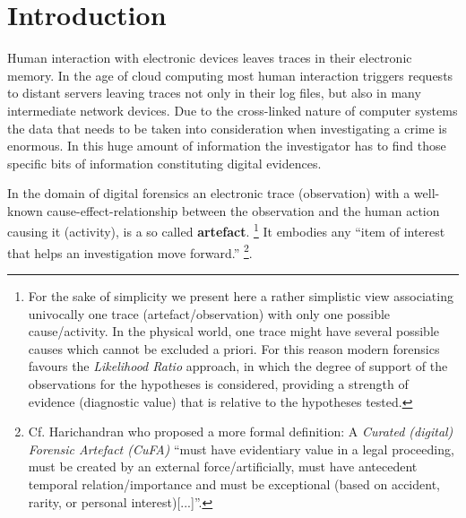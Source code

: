 \documentclass[final,5p,times,twocolumn]{elsarticle}
\begin{document}








\section{Introduction}

Human interaction with electronic devices leaves traces in their electronic
memory. In the age of cloud computing most human interaction triggers requests
to distant servers leaving traces not only in their log files, but also in many
intermediate network devices. Due to the cross-linked nature of computer systems
the data that needs to be taken into consideration when investigating a crime is
enormous. In this huge amount of information the investigator has to find those
specific bits of information constituting digital evidences. 

In the domain of digital forensics an electronic trace (observation) with a
well-known cause-effect-relationship between the observation and the human
action causing it (activity), is a so called \textbf{artefact}.  \footnote{For
the sake of simplicity we present here a rather simplistic view associating
univocally one trace (artefact/observation) with only one possible
cause/activity. In the physical world, one trace might have several possible
causes which cannot be excluded a priori. For this reason modern forensics
favours the \emph{Likelihood Ratio} approach, in which the degree of support of
the observations for the hypotheses is considered, providing a strength of
evidence (diagnostic value) that is relative to the hypotheses tested.} It
embodies any ``item of interest that helps an investigation move forward.''
\cite[p. 125]{harichandran2016}\footnote{Cf. Harichandran \cite[p.
131]{harichandran2016} who proposed a more formal definition: A \emph{Curated
(digital) Forensic Artefact (CuFA)} ``must have evidentiary value in a legal
proceeding, must be created by an external force/artificially, must have
antecedent temporal relation/importance and must be exceptional (based on
accident, rarity, or personal interest)[...]''.}.
\end{document}
